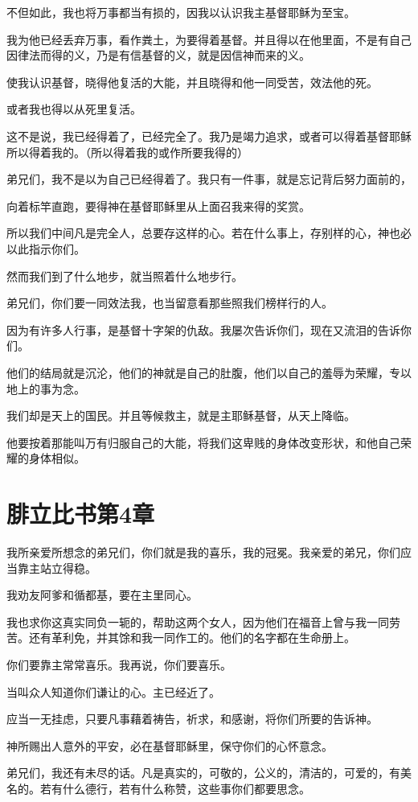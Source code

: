 \documentclass[12pt,oneside]{book}
\begin{document}
不但如此，我也将万事都当有损的，因我以认识我主基督耶稣为至宝。

我为他已经丢弃万事，看作粪土，为要得着基督。并且得以在他里面，不是有自己因律法而得的义，乃是有信基督的义，就是因信神而来的义。

使我认识基督，晓得他复活的大能，并且晓得和他一同受苦，效法他的死。

或者我也得以从死里复活。

这不是说，我已经得着了，已经完全了。我乃是竭力追求，或者可以得着基督耶稣所以得着我的。（所以得着我的或作所要我得的）

弟兄们，我不是以为自己已经得着了。我只有一件事，就是忘记背后努力面前的，

向着标竿直跑，要得神在基督耶稣里从上面召我来得的奖赏。

所以我们中间凡是完全人，总要存这样的心。若在什么事上，存别样的心，神也必以此指示你们。

然而我们到了什么地步，就当照着什么地步行。

弟兄们，你们要一同效法我，也当留意看那些照我们榜样行的人。

因为有许多人行事，是基督十字架的仇敌。我屡次告诉你们，现在又流泪的告诉你们。

他们的结局就是沉沦，他们的神就是自己的肚腹，他们以自己的羞辱为荣耀，专以地上的事为念。

我们却是天上的国民。并且等候救主，就是主耶稣基督，从天上降临。

他要按着那能叫万有归服自己的大能，将我们这卑贱的身体改变形状，和他自己荣耀的身体相似。

\chapter{腓立比书第4章}
我所亲爱所想念的弟兄们，你们就是我的喜乐，我的冠冕。我亲爱的弟兄，你们应当靠主站立得稳。

我劝友阿爹和循都基，要在主里同心。

我也求你这真实同负一轭的，帮助这两个女人，因为他们在福音上曾与我一同劳苦。还有革利免，并其馀和我一同作工的。他们的名字都在生命册上。

你们要靠主常常喜乐。我再说，你们要喜乐。

当叫众人知道你们谦让的心。主已经近了。

应当一无挂虑，只要凡事藉着祷告，祈求，和感谢，将你们所要的告诉神。

神所赐出人意外的平安，必在基督耶稣里，保守你们的心怀意念。

弟兄们，我还有未尽的话。凡是真实的，可敬的，公义的，清洁的，可爱的，有美名的。若有什么德行，若有什么称赞，这些事你们都要思念。
\end{document}
